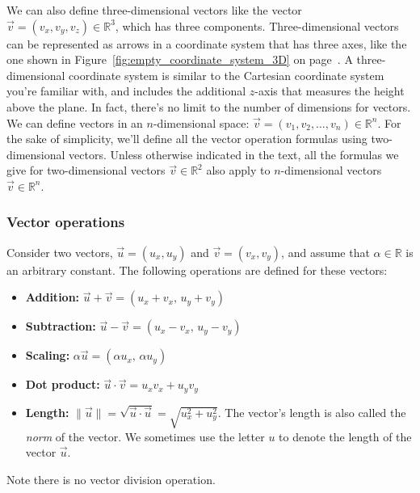 		We can also define three-dimensional vectors like the vector $\vec{v} = (v_x, v_y, v_z) \in \mathbb{R}^3$,
		which has three components.
		Three-dimensional vectors can be represented as arrows in a coordinate system that has three axes,				
		like the one shown in Figure~\ref{fig:empty_coordinate_system_3D} on page~\pageref{fig:empty_coordinate_system_3D}.
		A three-dimensional coordinate system is similar to the Cartesian coordinate system you're familiar with,
		and includes the additional $z$-axis that measures the height above the plane.
		In fact,
		there's no limit to the number of dimensions for vectors.
		We can define vectors in an $n$-dimensional space:								
		$\vec{v} = (v_1, v_2, \ldots, v_n) \in \mathbb{R}^n$.
		For the sake of simplicity,
		we'll define all the vector operation formulas using two-dimensional vectors.
		Unless otherwise indicated in the text,
		all the formulas we give for two-dimensional vectors $\vec{v} \in \mathbb{R}^2$
		also apply to $n$-dimensional vectors $\vec{v} \in \mathbb{R}^n$.


		\subsubsection{Vector operations}

			Consider two vectors,
			$\vec{u}=(u_x,u_y) $ and $\vec{v}=(v_x,v_y)$,
			and assume that $\alpha \in \mathbb{R}$ is an arbitrary constant. 
			The following operations are defined for these vectors:
			\begin{itemize}
				\item 	\textbf{Addition:}	$\vec{u} + \vec{v} = (u_x+v_x,\, u_y+v_y)$
				\item 	\textbf{Subtraction:}	$\vec{u} - \vec{v} = (u_x-v_x,\, u_y-v_y)$
				\item 	\textbf{Scaling:}		$\alpha \vec{u} = (\alpha u_x,\, \alpha u_y)$
				\item 	\textbf{Dot product:}	$\vec{u} \cdot \vec{v}  = u_xv_x+u_yv_y$								
				\item 	\textbf{Length:}		$\|\vec{u}\| = \sqrt{\vec{u}\cdot\vec{u}} = \sqrt{u_x^2+u_y^2}$.
						The vector's length is also called the \emph{norm} of the vector.
						We sometimes use the letter $u$ to denote the length of the vector $\vec{u}$.
			\end{itemize}

			\noindent
			Note there is no vector division operation.

